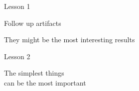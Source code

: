 \documentclass[aspectratio=169,12pt,t]{beamer}
\begin{document}
\begin{frame}[c]{Lesson 1}


\centerline{\Large Follow up artifacts}

\bigskip \bigskip

\centerline{\large \hilit They might be the most interesting results}


\end{frame}




\begin{frame}[c]{Lesson 2}


  \centering

\Large The simplest things \\[4pt]
    can be the most important



\end{frame}
\end{document}
